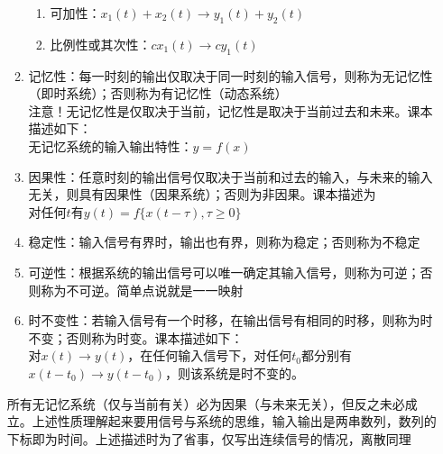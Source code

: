 \documentclass{article}
\begin{document}
\begin{enumerate}[label=(\arabic*)]
\begin{enumerate}[label=(\roman*)]
\begin{enumerate}[label=(\alph*)]
									\item 可加性：$x_1(t)+x_2(t)\to y_1(t)+y_2(t)$
									\item 比例性或其次性：$cx_1(t)\to cy_1(t)$
								\end{enumerate}
					\item 记忆性：每一时刻的输出仅取决于同一时刻的输入信号，则称为{\red 无}记忆性（即时系统）；否则称为有记忆性（动态系统）\\
								{\red 注意！无记忆性是仅取决于当前，记忆性是取决于当前过去和未来}。课本描述如下：\\
								无记忆系统的输入输出特性：$y=f(x)$
					\item 因果性：任意时刻的输出信号仅取决于当前和过去的输入，与未来的输入无关，则具有因果性（因果系统）；否则为非因果。课本描述为\\
								对任何$t$有$y(t)=f\{x(t-\tau),\tau \geq 0\}$
					\item 稳定性：输入信号有界时，输出也有界，则称为稳定；否则称为不稳定
					\item 可逆性：根据系统的输出信号可以唯一确定其输入信号，则称为可逆；否则称为不可逆。简单点说就是一一映射
					\item 时不变性：若输入信号有一个时移，在输出信号有相同的时移，则称为时不变；否则称为时变。课本描述如下：\\
								对$x(t)\to y(t)$，在任何输入信号下，对任何$t_0$都分别有$x(t-t_0)\to y(t-t_0)$，则该系统是时不变的。
				\end{enumerate}
				\begin{remark}
					所有无记忆系统（仅与当前有关）必为因果（与未来无关），但反之未必成立。上述性质理解起来要用信号与系统的思维，输入输出是两串数列，数列的下标即为时间。上述描述时为了省事，仅写出连续信号的情况，离散同理
				\end{remark}
\end{enumerate}
\end{document}
